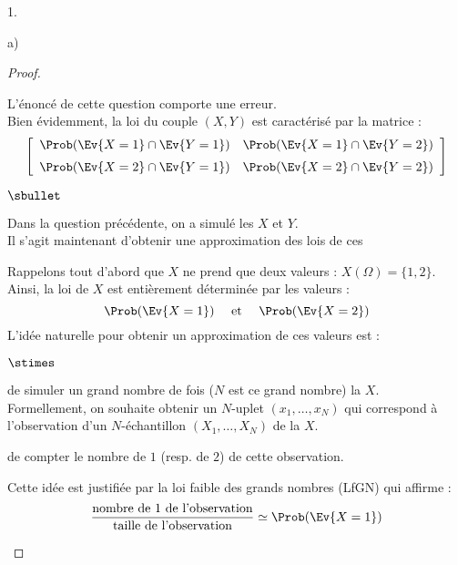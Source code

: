 \documentclass[11pt]{article}%
\begin{document}
\begin{noliste}{1.}
\begin{noliste}{a)}
    \begin{proof}~
      \begin{remark}%
        L'énoncé de cette question comporte une erreur. \\
        Bien évidemment, la loi du couple $(X,Y)$ est caractérisé par la
        matrice :
        \[ 
        \left[ 
          \begin{array}{cc}
            \Prob(\Ev{X=1} \cap \Ev{Y=1}) &  \Prob(\Ev{X=1} \cap 
            \Ev{Y=2})\\[.2cm]
            \Prob(\Ev{X=2} \cap \Ev{Y=1}) &  \Prob(\Ev{X=2} \cap \Ev{Y=2})  
          \end{array} 
        \right] 
        \]
      \end{remark}
      \begin{noliste}{$\sbullet$}
      \item Dans la question précédente, on a simulé les \var $X$ et
        $Y$.\\
        Il s'agit maintenant d'obtenir une approximation des lois de
        ces \var

      \item Rappelons tout d'abord que $X$ ne prend que deux valeurs :
        $X(\Omega) = \{1, 2\}$.\\
        Ainsi, la loi de $X$ est entièrement déterminée par les
        valeurs :
        \[
        \Prob(\Ev{X = 1}) \quad \text{ et } \quad \Prob(\Ev{X = 2})
        \]
        L'idée naturelle pour obtenir un approximation de ces valeurs
        est : 
        \begin{noliste}{$\stimes$}
        \item de simuler un grand nombre de fois ($N$ est ce grand
          nombre) la \var $X$.\\
          Formellement, on souhaite obtenir un $N$-uplet $(x_1,
          \ldots, x_N)$ qui correspond à l'observation d'un
          $N$-échantillon $(X_1, \ldots, X_N)$ de la \var $X$.
        \item de compter le nombre de $1$ (resp. de $2$) de cette
          observation.          
        \end{noliste}
        Cette idée est justifiée par la loi faible des grands nombres
        (LfGN) qui affirme : 
        \[
        \dfrac{\text{nombre de $1$ de l'observation}}{\text{taille de
            l'observation}} \simeq \Prob(\Ev{X = 1})
        \]


        \newpage



\end{noliste}
\end{proof}
\end{noliste}
\end{noliste}
\end{document}
